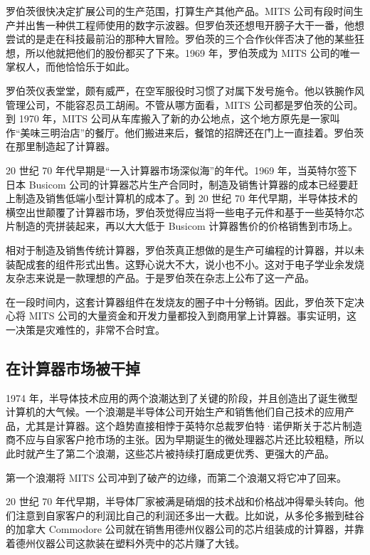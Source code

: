 \documentclass[12pt,UTF8]{ctexbook}
\begin{document}
罗伯茨很快决定扩展公司的生产范围，打算生产其他产品。MITS 公司有段时间生产并出售一种供工程师使用的数字示波器。但罗伯茨还想甩开膀子大干一番，他想尝试的是走在科技最前沿的那种大冒险。罗伯茨的三个合作伙伴否决了他的某些狂想，所以他就把他们的股份都买了下来。1969 年，罗伯茨成为 MITS 公司的唯一掌权人，而他恰恰乐于如此。

罗伯茨仪表堂堂，颇有威严，在空军服役时习惯了对属下发号施令。他以铁腕作风管理公司，不能容忍员工胡闹。不管从哪方面看，MITS 公司都是罗伯茨的公司。到 1970 年，MITS 公司从车库搬入了新的办公地点，这个地方原先是一家叫作“美味三明治店”的餐厅。他们搬进来后，餐馆的招牌还在门上一直挂着。罗伯茨在那里制造起了计算器。

20 世纪 70 年代早期是“一入计算器市场深似海”的年代。1969 年，当英特尔签下日本 Busicom 公司的计算器芯片生产合同时，制造及销售计算器的成本已经要赶上制造及销售低端小型计算机的成本了。到 20 世纪 70 年代早期，半导体技术的横空出世颠覆了计算器市场，罗伯茨觉得应当将一些电子元件和基于一些英特尔芯片制造的壳拼装起来，再以大大低于 Busicom 计算器售价的价格销售到市场上。

相对于制造及销售传统计算器，罗伯茨真正想做的是生产可编程的计算器，并以未装配成套的组件形式出售。这野心说大不大，说小也不小。这对于电子学业余发烧友杂志来说是一款理想的产品。于是罗伯茨在杂志上公布了这一产品。

在一段时间内，这套计算器组件在发烧友的圈子中十分畅销。因此，罗伯茨下定决心将 MITS 公司的大量资金和开发力量都投入到商用掌上计算器。事实证明，这一决策是灾难性的，非常不合时宜。





\subsection{在计算器市场被干掉}


1974 年，半导体技术应用的两个浪潮达到了关键的阶段，并且创造出了诞生微型计算机的大气候。一个浪潮是半导体公司开始生产和销售他们自己技术的应用产品，尤其是计算器。这个趋势直接相悖于英特尔总裁罗伯特·诺伊斯关于芯片制造商不应与自家客户抢市场的主张。因为早期诞生的微处理器芯片还比较粗糙，所以此时就产生了第二个浪潮，这些芯片被持续打磨成更优秀、更强大的产品。

第一个浪潮将 MITS 公司冲到了破产的边缘，而第二个浪潮又将它冲了回来。

20 世纪 70 年代早期，半导体厂家被满是硝烟的技术战和价格战冲得晕头转向。他们注意到自家客户的利润比自己的利润还多出一大截。比如说，从多伦多搬到硅谷的加拿大 Commodore 公司就在销售用德州仪器公司的芯片组装成的计算器，并靠着德州仪器公司这款装在塑料外壳中的芯片赚了大钱。
\end{document}
